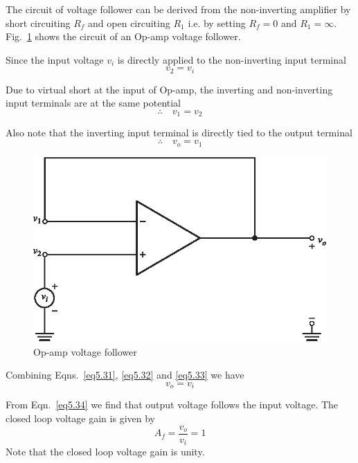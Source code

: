 The circuit of voltage follower can be derived from the non-inverting amplifier by short circuiting $R_{f}$ and open circuiting $R_{1}$ i.e. by setting $R_{f}=0$ and $R_{1}=\infty$. Fig.~\ref{fig5.13} shows the circuit of an Op-amp voltage follower.

Since the input voltage $v_{i}$ is directly applied to the non-inverting input terminal
\begin{equation}
v_{2}=v_{i}\label{eq5.31}
\end{equation}

Due to virtual short at the input of Op-amp, the inverting and non-inverting input terminals are at the same potential
\begin{equation}
\therefore\quad v_{1}=v_{2}\label{eq5.32}
\end{equation}

Also note that the inverting input terminal is directly tied to the output terminal
\begin{equation}
\therefore\quad v_{o}=v_{1}\label{eq5.33}
\end{equation}

\begin{figure}[H]
\centering
\includegraphics{chap4/S3-EE-06-021.eps}
\caption{Op-amp voltage follower}\label{fig5.13}
\end{figure}

Combining Eqns.~\eqref{eq5.31}, \eqref{eq5.32} and \eqref{eq5.33} we have
\begin{equation}
v_{o}=v_{i}\label{eq5.34}
\end{equation}

From Eqn.~\eqref{eq5.34} we find that output voltage follows the input voltage. The closed loop voltage gain is given by
\begin{equation}
A_{f}=\frac{v_{o}}{v_{i}}=1\label{eq5.35}
\end{equation}
Note that the closed loop voltage gain is unity.

